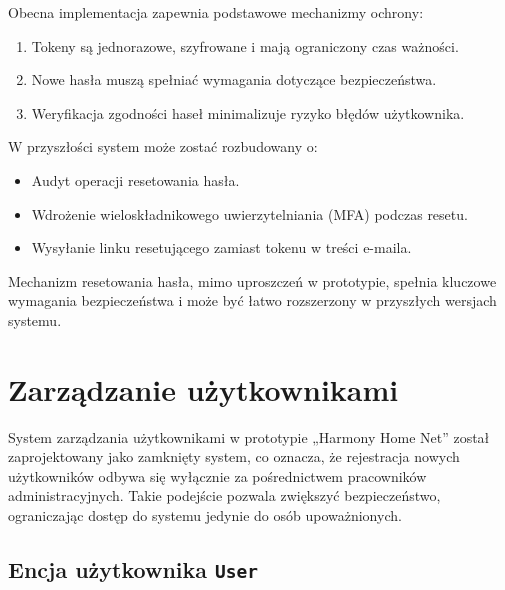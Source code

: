 \noindent Obecna implementacja zapewnia podstawowe mechanizmy ochrony:
\begin{enumerate}
    \item Tokeny są jednorazowe, szyfrowane i mają ograniczony czas ważności.
    \item Nowe hasła muszą spełniać wymagania dotyczące bezpieczeństwa.
    \item Weryfikacja zgodności haseł minimalizuje ryzyko błędów użytkownika.
\end{enumerate}
W przyszłości system może zostać rozbudowany o:
\begin{itemize}
    \item Audyt operacji resetowania hasła.
    \item Wdrożenie wieloskładnikowego uwierzytelniania (MFA) podczas resetu.
    \item Wysyłanie linku resetującego zamiast tokenu w treści e-maila.
\end{itemize}

Mechanizm resetowania hasła, mimo uproszczeń w prototypie, spełnia kluczowe wymagania bezpieczeństwa i może być łatwo rozszerzony w przyszłych wersjach systemu.

\section{Zarządzanie użytkownikami}

System zarządzania użytkownikami w prototypie „Harmony Home Net” został zaprojektowany jako zamknięty system, co oznacza, że rejestracja nowych użytkowników odbywa się wyłącznie za pośrednictwem pracowników administracyjnych. Takie podejście pozwala zwiększyć bezpieczeństwo, ograniczając dostęp do systemu jedynie do osób upoważnionych.

\subsection{Encja użytkownika \texttt{User}}

